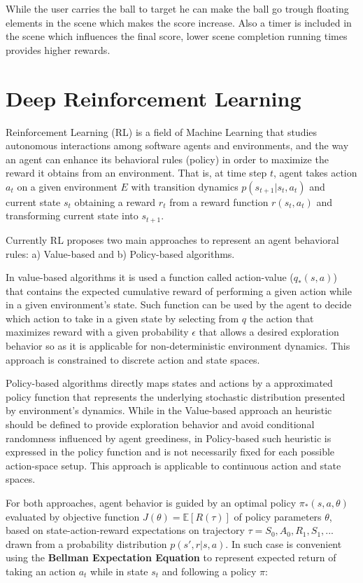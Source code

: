 \documentclass[peerreview]{IEEEtran}
\begin{document}
   While the user carries the ball to target he can make the ball go trough floating elements in the scene which makes the score increase. Also a timer is included in the scene which influences the final score, lower scene completion running times provides higher rewards.
   
   
\section{Deep Reinforcement Learning}

 Reinforcement Learning (RL) is a field of Machine Learning that studies autonomous interactions among software agents and environments, and the way an agent can enhance its behavioral rules (policy) in order to maximize the reward it obtains from an environment. That is, at time step $t$, agent takes action $a_t$ on a given environment $E$ with transition dynamics $p(s_{t+1}|s_t, a_t)$ and current state $s_t$ obtaining a reward $r_t$ from a reward function $r(s_t, a_t)$ and transforming current state into $s_{t+1}$.
 
 Currently RL proposes two main approaches to represent an agent behavioral rules: a) Value-based and b) Policy-based algorithms. 
 
 In value-based algorithms it is used a function called action-value ($q_*(s,a)$) that contains the expected cumulative reward of performing a given action while in a given environment's state. Such function can be used by the agent to decide which action to take in a given state by selecting from $q$ the action that maximizes reward with a given probability $\epsilon$ that allows a desired exploration behavior so as it is applicable for non-deterministic environment dynamics. This approach is constrained to discrete action and state spaces.
 
 Policy-based algorithms directly maps states and actions by a approximated policy function that represents the underlying stochastic distribution presented by environment's dynamics. While in the Value-based approach an heuristic should be defined to provide exploration behavior and avoid conditional randomness influenced by agent greediness, in Policy-based such heuristic is expressed in the policy function and is not necessarily fixed for each possible action-space setup. This approach is applicable to continuous action and state spaces.
 
 For both approaches, agent behavior is guided by an optimal policy $\pi_*(s, a, \theta)$ evaluated by objective function $J(\theta)=\mathbb{E}[R(\tau)]$ of policy parameters $\theta$, based on state-action-reward expectations on trajectory $\tau=S_0, A_0, R_1, S_1, ... $ drawn from a probability distribution \textbf{$p(s',r|s, a)$}. In such case is convenient using the \textbf{Bellman Expectation Equation} to represent expected return of taking an action $a_t$ while in state $s_t$ and following a policy $\pi$:  
 
\end{document}
